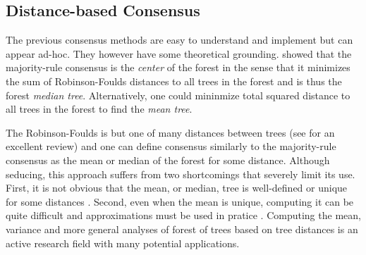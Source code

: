 \subsection{Distance-based Consensus} \label{sec:distance-based-consensus-tree}

The previous consensus methods are easy to understand and implement but can appear ad-hoc. They however have some theoretical grounding. \citet{Barthelemy1986} showed that the majority-rule consensus is the \emph{center} of the forest in the sense that it minimizes the sum of Robinson-Foulds distances \citep{Robinson1979} to all trees in the forest and is thus the forest \emph{median tree}. Alternatively, one could mininmize total squared distance to all trees in the forest to find the \emph{mean tree}. 

The Robinson-Foulds is but one of many distances between trees (see \citet{St.John2017} for an excellent review) and one can define consensus similarly to the majority-rule consensus as the mean or median of the forest for some distance. Although seducing, this approach suffers from two shortcomings that severely limit its use. First, it is not obvious that the mean, or median, tree is well-defined or unique for some distances \citep{Billera2001}. Second, even when the mean is unique, computing it can be quite difficult and approximations must be used in pratice \citep{Miller2015}. Computing the mean, variance and more general analyses of forest of trees based on tree distances is an active research field with many potential applications. 
